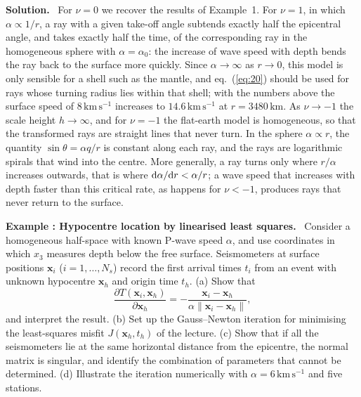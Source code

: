 \documentclass[a4paper,12pt]{paper}
\newcounter{example}
\renewenvironment{example}[1]{%
  \refstepcounter{example}%
  \begin{mdframed}[linewidth=1pt,innertopmargin=6pt,innerbottommargin=6pt]%
  \noindent\textbf{Example \theexample: #1.}\ }{%
  \end{mdframed}}
\newenvironment{solution}{\par\noindent\textbf{Solution.}\ }{\par\medskip}
\begin{document}
\begin{solution}
For $\nu=0$ we recover the results of Example~1. For $\nu=1$, in which $\alpha\propto1/r$,
a ray with a given take-off angle subtends exactly half the epicentral angle, and takes exactly
half the time, of the corresponding ray in the homogeneous sphere with $\alpha=\alpha_{0}$: the
increase of wave speed with depth bends the ray back to the surface more quickly. Since
$\alpha\to\infty$ as $r\to0$, this model is only sensible for a shell such as the mantle, and
eq.~(\ref{eq:20}) should be used for rays whose turning radius lies within that shell; with
the numbers above the surface speed of $8\,\mathrm{km\,s^{-1}}$ increases to
$14.6\,\mathrm{km\,s^{-1}}$ at $r=3480\,\mathrm{km}$. As $\nu\to-1$ the scale height $h\to\infty$,
and for $\nu=-1$ the flat-earth model is homogeneous, so that the transformed rays are straight
lines that never turn. In the sphere $\alpha\propto r$, the quantity
$\sin\theta=\alpha q/r$ is constant along each ray, and the rays are logarithmic spirals that
wind into the centre. More generally, a ray turns only where $r/\alpha$ increases outwards, that
is where $\mathrm{d}\alpha/\mathrm{d} r<\alpha/r$; a wave speed that increases with depth faster than this
critical rate, as happens for $\nu<-1$, produces rays that never return to the surface.
\end{solution}

\begin{example}{Hypocentre location by linearised least squares}
Consider a homogeneous half-space with known P-wave speed $\alpha$, and use coordinates in which
$x_{3}$ measures depth below the free surface. Seismometers at surface positions
$\mathbf{x}_{i}$ ($i=1,\dots,N_{s}$) record the first arrival times $t_{i}$ from an event with
unknown hypocentre $\mathbf{x}_{h}$ and origin time $t_{h}$. (a) Show that
\begin{equation*}
\frac{\partial T(\mathbf{x}_{i},\mathbf{x}_{h})}{\partial\mathbf{x}_{h}}
=-\frac{\mathbf{x}_{i}-\mathbf{x}_{h}}{\alpha\|\mathbf{x}_{i}-\mathbf{x}_{h}\|},
\end{equation*}
and interpret the result. (b) Set up the Gauss--Newton iteration for minimising the
least-squares misfit $J(\mathbf{x}_{h},t_{h})$ of the lecture. (c) Show that if all the
seismometers lie at the same horizontal distance from the epicentre, the normal matrix is
singular, and identify the combination of parameters that cannot be determined.
(d) Illustrate the iteration numerically with $\alpha=6\,\mathrm{km\,s^{-1}}$ and five stations.
\end{example}
\end{document}

